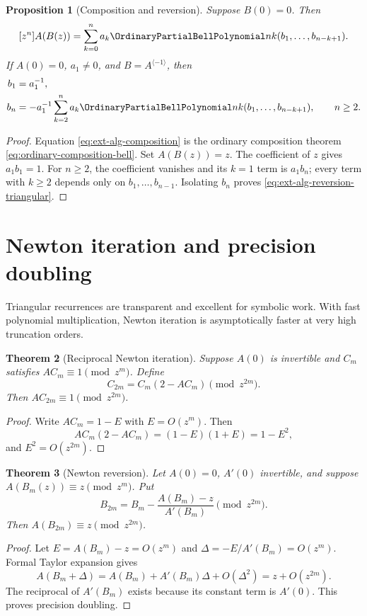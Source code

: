 \documentclass[11pt,a4paper,oneside,openany]{book}
\newtheorem{theorem}{Theorem}[chapter]
\newtheorem{proposition}[theorem]{Proposition}
\theoremstyle{definition}
\theoremstyle{remark}
\begin{document}
\begin{proposition}[Composition and reversion]
Suppose \(B(0)=0\).  Then
\begin{equation}\label{eq:ext-alg-composition}
 [z^n]A(B(z))
 =\sum_{k=0}^na_k\OrdinaryPartialBellPolynomial nk(b_1,\ldots,b_{n-k+1}).
\end{equation}
If \(A(0)=0\), \(a_1\ne0\), and
\(B=A^{\langle-1\rangle}\), then
\begin{align}
 b_1&=a_1^{-1},\label{eq:ext-alg-reversion-first}\\
 b_n&=-a_1^{-1}\sum_{k=2}^na_k
 \OrdinaryPartialBellPolynomial nk(b_1,\ldots,b_{n-k+1}),\qquad n\ge2.
 \label{eq:ext-alg-reversion-triangular}
\end{align}
\end{proposition}
\begin{proof}
Equation \eqref{eq:ext-alg-composition} is the ordinary composition theorem
\eqref{eq:ordinary-composition-bell}.  Set \(A(B(z))=z\).  The coefficient of
\(z\) gives \(a_1b_1=1\).  For \(n\ge2\), the coefficient vanishes and its
\(k=1\) term is \(a_1b_n\); every term with \(k\ge2\) depends only on
\(b_1,\ldots,b_{n-1}\).  Isolating \(b_n\) proves
\eqref{eq:ext-alg-reversion-triangular}.
\end{proof}

\section{Newton iteration and precision doubling}

Triangular recurrences are transparent and excellent for symbolic work.  With
fast polynomial multiplication, Newton iteration is asymptotically faster at
very high truncation orders.

\begin{theorem}[Reciprocal Newton iteration]
Suppose \(A(0)\) is invertible and \(C_m\) satisfies
\(AC_m\equiv1\pmod{z^m}\).  Define
\begin{equation}\label{eq:ext-newton-reciprocal}
 C_{2m}=C_m(2-AC_m)\pmod{z^{2m}}.
\end{equation}
Then \(AC_{2m}\equiv1\pmod{z^{2m}}\).
\end{theorem}
\begin{proof}
Write \(AC_m=1-E\) with \(E=O(z^m)\).  Then
\[
 AC_m(2-AC_m)=(1-E)(1+E)=1-E^2,
\]
and \(E^2=O(z^{2m})\).
\end{proof}

\begin{theorem}[Newton reversion]
Let \(A(0)=0\), \(A'(0)\) invertible, and suppose
\(A(B_m(z))\equiv z\pmod{z^m}\).  Put
\begin{equation}\label{eq:ext-newton-reversion}
 B_{2m}=B_m-\frac{A(B_m)-z}{A'(B_m)}\pmod{z^{2m}}.
\end{equation}
Then \(A(B_{2m})\equiv z\pmod{z^{2m}}\).
\end{theorem}
\begin{proof}
Let \(E=A(B_m)-z=O(z^m)\) and
\(\Delta=-E/A'(B_m)=O(z^m)\).  Formal Taylor expansion gives
\[
 A(B_m+\Delta)=A(B_m)+A'(B_m)\Delta+O(\Delta^2)
 =z+O(z^{2m}).
\]
The reciprocal of \(A'(B_m)\) exists because its constant term is
\(A'(0)\).  This proves precision doubling.
\end{proof}
\end{document}
